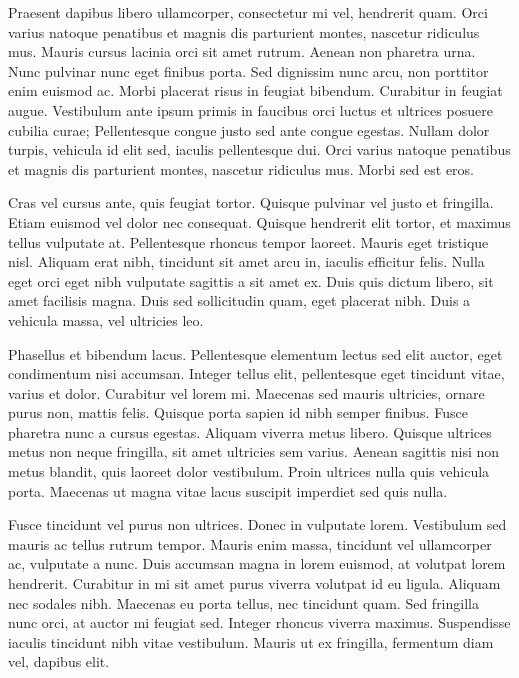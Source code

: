 Praesent dapibus libero ullamcorper, consectetur mi vel, hendrerit quam. Orci varius natoque penatibus et magnis dis parturient montes, nascetur ridiculus mus. Mauris cursus lacinia orci sit amet rutrum. Aenean non pharetra urna. Nunc pulvinar nunc eget finibus porta. Sed dignissim nunc arcu, non porttitor enim euismod ac. Morbi placerat risus in feugiat bibendum. Curabitur in feugiat augue. Vestibulum ante ipsum primis in faucibus orci luctus et ultrices posuere cubilia curae; Pellentesque congue justo sed ante congue egestas. Nullam dolor turpis, vehicula id elit sed, iaculis pellentesque dui. Orci varius natoque penatibus et magnis dis parturient montes, nascetur ridiculus mus. Morbi sed est eros.

Cras vel cursus ante, quis feugiat tortor. Quisque pulvinar vel justo et fringilla. Etiam euismod vel dolor nec consequat. Quisque hendrerit elit tortor, et maximus tellus vulputate at. Pellentesque rhoncus tempor laoreet. Mauris eget tristique nisl. Aliquam erat nibh, tincidunt sit amet arcu in, iaculis efficitur felis. Nulla eget orci eget nibh vulputate sagittis a sit amet ex. Duis quis dictum libero, sit amet facilisis magna. Duis sed sollicitudin quam, eget placerat nibh. Duis a vehicula massa, vel ultricies leo.

Phasellus et bibendum lacus. Pellentesque elementum lectus sed elit auctor, eget condimentum nisi accumsan. Integer tellus elit, pellentesque eget tincidunt vitae, varius et dolor. Curabitur vel lorem mi. Maecenas sed mauris ultricies, ornare purus non, mattis felis. Quisque porta sapien id nibh semper finibus. Fusce pharetra nunc a cursus egestas. Aliquam viverra metus libero. Quisque ultrices metus non neque fringilla, sit amet ultricies sem varius. Aenean sagittis nisi non metus blandit, quis laoreet dolor vestibulum. Proin ultrices nulla quis vehicula porta. Maecenas ut magna vitae lacus suscipit imperdiet sed quis nulla.

Fusce tincidunt vel purus non ultrices. Donec in vulputate lorem. Vestibulum sed mauris ac tellus rutrum tempor. Mauris enim massa, tincidunt vel ullamcorper ac, vulputate a nunc. Duis accumsan magna in lorem euismod, at volutpat lorem hendrerit. Curabitur in mi sit amet purus viverra volutpat id eu ligula. Aliquam nec sodales nibh. Maecenas eu porta tellus, nec tincidunt quam. Sed fringilla nunc orci, at auctor mi feugiat sed. Integer rhoncus viverra maximus. Suspendisse iaculis tincidunt nibh vitae vestibulum. Mauris ut ex fringilla, fermentum diam vel, dapibus elit.

